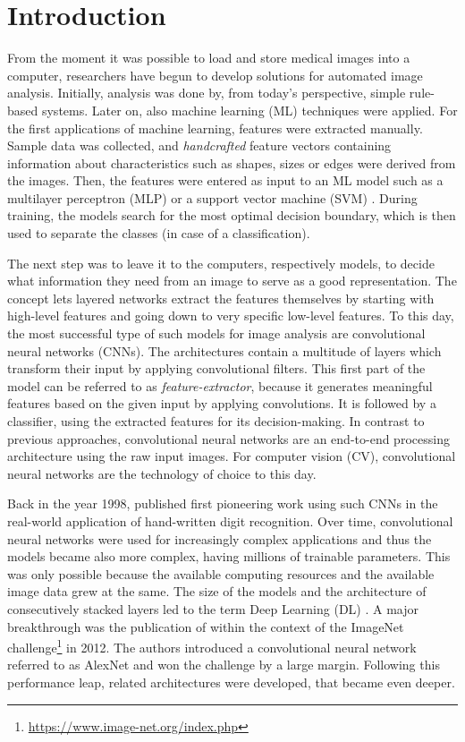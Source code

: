 \section{Introduction}
\label{sec:Introduction}

From the moment it was possible to load and store medical images into a computer, researchers have begun to develop solutions for automated image analysis.
Initially, analysis was done by, from today's perspective, simple rule-based systems.
Later on, also machine learning (ML) techniques were applied. For the first applications of machine learning, features were extracted manually. Sample data was collected, and \textit{handcrafted} feature vectors containing information about characteristics such as shapes, sizes or edges were derived from the images. 
Then, the features were entered as input to an ML model such as a multilayer perceptron (MLP) \citep{Rumelhart1986LearningErrors} or a support vector machine (SVM) \citep{Vapnik1995TheTheory}. During training, the models search for the most optimal decision boundary, which is then used to separate the classes (in case of a classification).

The next step was to leave it to the computers, respectively models, to decide what information they need from an image to serve as a good representation. The concept lets layered networks extract the features themselves by starting with high-level features and going down to very specific low-level features. To this day, the most successful type of such models for image analysis are convolutional neural networks (CNNs). The architectures contain a multitude of layers which transform their input by applying convolutional filters. This first part of the model can be referred to as \textit{feature-extractor}, because it generates meaningful features based on the given input by applying convolutions. It is followed by a classifier, using the extracted features for its decision-making. In contrast to previous approaches, convolutional neural networks are an end-to-end processing architecture using the raw input images. For computer vision (CV), convolutional neural networks are the technology of choice to this day.

Back in the year 1998, \cite{LeCun1998Gradient-basedRecognition} published first pioneering work using such CNNs in the real-world application of hand-written digit recognition.
Over time, convolutional neural networks were used for increasingly complex applications and thus the models became also more complex, having millions of trainable parameters.
This was only possible because the available computing resources and the available image data grew at the same.
The size of the models and the architecture of consecutively stacked layers led to the term Deep Learning (DL) \citep{Lecun2015DeepLearning}.
A major breakthrough was the publication of \cite{Krizhevsky2012ImageNetNetworks} within the context of the ImageNet challenge\footnote{\url{https://www.image-net.org/index.php}} in 2012. The authors introduced a convolutional neural network referred to as AlexNet and won the challenge by a large margin.
Following this performance leap, related architectures were developed, that became even deeper.

